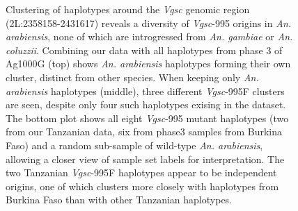 \documentclass[a4paper,12pt]{article}
\begin{document}
\begin{figure}[h]
	\begin{center}
	\end{center}
	\caption{\footnotesize Clustering of haplotypes around the \textit{Vgsc} genomic region (2L:2358158-2431617) reveals a diversity of \textit{Vgsc}-995 origins in \textit{An. arabiensis}, none of which are introgressed from \textit{An. gambiae} or \textit{An. coluzzii}. Combining our data with all haplotypes from phase 3 of Ag1000G (top) shows \textit{An. arabiensis} haplotypes forming their own cluster, distinct from other species. When keeping only \textit{An. arabiensis} haplotypes (middle), three different \textit{Vgsc}-995F clusters are seen, despite only four such haplotypes exising in the dataset. The bottom plot shows all eight \textit{Vgsc}-995 mutant haplotypes (two from our Tanzanian data, six from phase3 samples from Burkina Faso) and a random sub-sample of wild-type \textit{An. arabiensis}, allowing a closer view of sample set labels for interpretation. The two Tanzanian \textit{Vgsc}-995F haplotypes appear to be independent origins, one of which clusters more closely with haplotypes from Burkina Faso than with other Tanzanian haplotypes. }
	\label{FigS8}
\end{figure}
\end{document}

